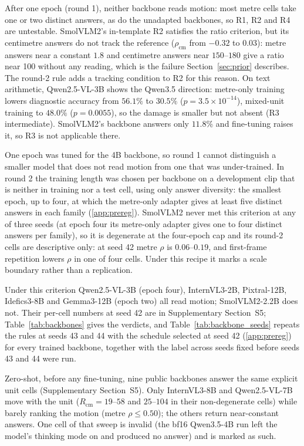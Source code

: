 \documentclass[preprint,number]{elsarticle}
\newcommand{\supp}[1]{Supplementary Section~S#1}
\begin{document}
After one epoch (round 1), neither backbone reads motion: most metre cells take
one or two distinct answers, as do the unadapted backbones, so R1, R2 and R4
are untestable. SmolVLM2's in-template R2 satisfies the ratio criterion, but its
centimetre answers do not track the reference ($\rho_{\mathrm{cm}}$ from
$-0.32$ to $0.03$): metre answers near a constant $1.8$ and centimetre answers
near $150$--$180$ give a ratio near 100 without any reading, which is the
failure Section~\ref{sec:prior} describes. The round-2 rule adds a tracking
condition to R2 for this reason. On text arithmetic, Qwen2.5-VL-3B shows the
Qwen3.5 direction: metre-only training lowers diagnostic accuracy from
$56.1\%$ to $30.5\%$ ($p=3.5\times10^{-14}$), mixed-unit training to $48.0\%$
($p=0.0055$), so the damage is smaller but not absent (R3 intermediate).
SmolVLM2's backbone answers only $11.8\%$ and fine-tuning raises it, so R3 is
not applicable there.

One epoch was tuned for the 4B backbone, so round 1 cannot distinguish a
smaller model that does not read motion from one that was under-trained. In
round 2 the training length was chosen per backbone on a development clip that
is neither in training nor a test cell, using only answer diversity: the
smallest epoch, up to four, at which the metre-only adapter gives at least five
distinct answers in each family (\ref{app:prereg}).
SmolVLM2 never met this criterion at any of three seeds (at epoch four its
metre-only adapter gives one to four distinct answers per family), so it is
degenerate at the four-epoch cap and its round-2 cells are descriptive only: at
seed 42 metre $\rho$ is $0.06$--$0.19$, and first-frame repetition lowers $\rho$
in one of four cells. Under this recipe it marks a scale boundary rather than a
replication.

Under this criterion Qwen2.5-VL-3B (epoch four), InternVL3-2B, Pixtral-12B,
Idefics3-8B and Gemma3-12B (epoch two) all read motion; SmolVLM2-2.2B does
not. Their per-cell numbers at seed 42 are in \supp{5}; Table~\ref{tab:backbones}
gives the verdicts, and Table~\ref{tab:backbone_seeds} repeats the rules at seeds 43
and 44 with the schedule selected at seed 42 (\ref{app:prereg}) for every
trained backbone, together with the label across seeds fixed before seeds 43
and 44 were run.



Zero-shot, before any fine-tuning, nine public backbones answer the same
explicit unit cells (\supp{5}). Only InternVL3-8B and Qwen2.5-VL-7B move with
the unit ($R_{\mathrm{cm}}=19$--$58$ and $25$--$104$ in their non-degenerate
cells) while barely ranking the motion (metre $\rho\le0.50$); the others
return near-constant answers. One cell of that sweep is invalid (the bf16
Qwen3.5-4B run left the model's thinking mode on and produced no answer) and
is marked as such.
\end{document}
